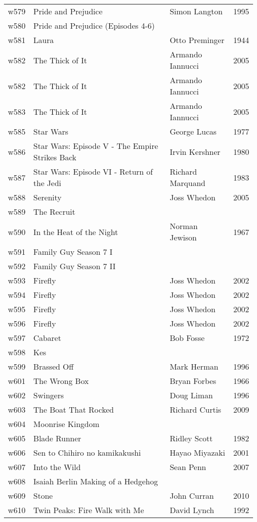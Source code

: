 \documentclass{article}
\begin{document}
\begin {center}
\begin{longtable}{l p{10cm} l l}
w579 & Pride and Prejudice & Simon Langton & 1995 \\
w580 & Pride and Prejudice (Episodes 4-6) &  &  \\
w581 & Laura & Otto Preminger & 1944 \\
w582 & The Thick of It & Armando Iannucci & 2005 \\
w582 & The Thick of It & Armando Iannucci & 2005 \\
w583 & The Thick of It & Armando Iannucci & 2005 \\
w585 & Star Wars & George Lucas & 1977 \\
w586 & Star Wars: Episode V - The Empire Strikes Back & Irvin Kershner & 1980 \\
w587 & Star Wars: Episode VI - Return of the Jedi & Richard Marquand & 1983 \\
w588 & Serenity & Joss Whedon & 2005 \\
w589 & The Recruit &  &  \\
w590 & In the Heat of the Night & Norman Jewison & 1967 \\
w591 & Family Guy Season 7 I &  &  \\
w592 & Family Guy Season 7 II &  &  \\
w593 & Firefly & Joss Whedon & 2002 \\
w594 & Firefly & Joss Whedon & 2002 \\
w595 & Firefly & Joss Whedon & 2002 \\
w596 & Firefly & Joss Whedon & 2002 \\
w597 & Cabaret & Bob Fosse & 1972 \\
w598 & Kes &  &  \\
w599 & Brassed Off & Mark Herman & 1996 \\
w601 & The Wrong Box & Bryan Forbes & 1966 \\
w602 & Swingers & Doug Liman & 1996 \\
w603 & The Boat That Rocked & Richard Curtis & 2009 \\
w604 & Moonrise Kingdom &  &  \\
w605 & Blade Runner & Ridley Scott & 1982 \\
w606 & Sen to Chihiro no kamikakushi & Hayao Miyazaki & 2001 \\
w607 & Into the Wild & Sean Penn & 2007 \\
w608 & Isaiah Berlin Making of a Hedgehog &  &  \\
w609 & Stone & John Curran & 2010 \\
w610 & Twin Peaks: Fire Walk with Me & David Lynch & 1992 \\

\end{longtable}
\end{center}
\end{document}
